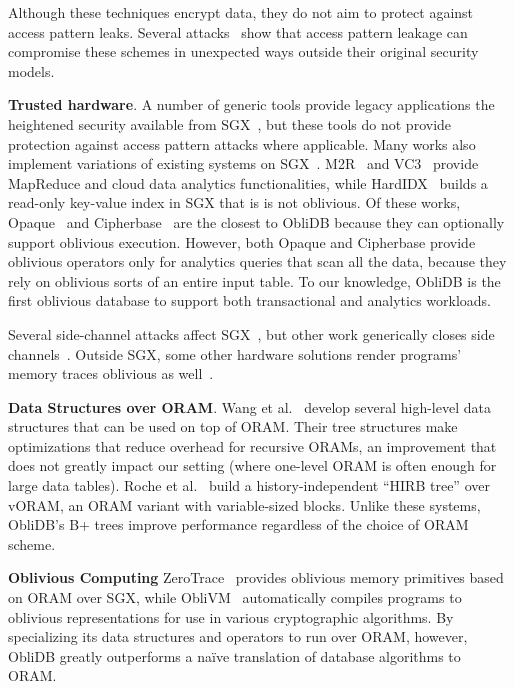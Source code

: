 \documentclass[letterpaper,twocolumn,10pt]{article}
\def\name/{ObliDB}
\begin{document}
Although these techniques encrypt data, they do not aim to protect against access pattern leaks.
Several attacks~\cite{IKK12, NKW15, CGPR15, ZKP16} show that access pattern leakage can compromise these schemes in unexpected ways outside their original security models.

\noindent \textbf{Trusted hardware}.
A number of generic tools provide legacy applications the heightened security available from SGX~\cite{BPH15, STTS17, ATG+16, HZX+16}, but these tools do not provide protection against access pattern attacks where applicable.
Many works also implement variations of existing systems on SGX~\cite{FBB+17,FVBG16,NFR+17}.
M2R~\cite{DSC+15} and VC3~\cite{SCF+15} provide MapReduce and cloud data analytics functionalities,
while HardIDX~\cite{FBB+17} builds a read-only key-value index in SGX that is is not oblivious.
Of these works, Opaque~\cite{ZDB+17} and Cipherbase~\cite{cipherbase} are the closest to \name/ because
they can optionally support oblivious execution.
However, both Opaque and Cipherbase provide oblivious operators only for analytics queries that scan all the data, because they rely on oblivious sorts of an entire input table.
To our knowledge, \name/ is the first oblivious database to support both transactional and analytics workloads.

Several side-channel attacks affect SGX~\cite{XCP15, BMD+17, LSG+16, WKPK16}, but other work generically closes side channels~\cite{SLKP17, SCNS16, RLT15, SLK+17}. Outside SGX, some other hardware solutions render programs' memory traces oblivious as well~\cite{CLD16, LHM+15, MLS+13}.

\noindent \textbf{Data Structures over ORAM}. Wang et al.~\cite{WNL+14} develop several high-level data structures that can be used on top of ORAM. Their tree structures make optimizations that reduce overhead for recursive ORAMs, an improvement that does not greatly impact our setting (where one-level ORAM is often enough for large data tables). Roche et al.~\cite{RAC16} build a history-independent ``HIRB tree'' over vORAM, an ORAM variant with variable-sized blocks. Unlike these systems, \name/'s B+ trees improve performance regardless of the choice of ORAM scheme.

\noindent \textbf{Oblivious Computing}
ZeroTrace~\cite{SGF17} provides oblivious memory primitives based on ORAM over SGX, while ObliVM~\cite{oblivm} automatically compiles programs to oblivious representations for use in various cryptographic algorithms. By specializing its data structures and operators to run over ORAM, however, \name/ greatly outperforms a na\"ive translation of database algorithms to ORAM.
\end{document}
